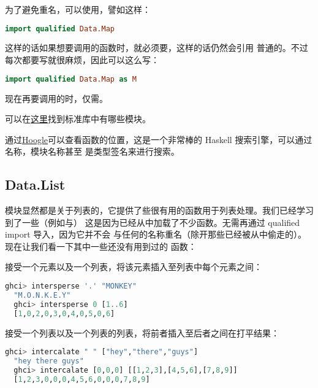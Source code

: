 \documentclass[./main.tex]{subfiles}
\begin{document}
为了避免重名，可以使用，譬如这样：

\begin{lstlisting}[language=Haskell]
  import qualified Data.Map
\end{lstlisting}

这样的话如果想要调用的函数时，就必须要，这样的话仍然会引用
普通的。不过每次都要写就很麻烦，因此可以这么写：

\begin{lstlisting}[language=Haskell]
  import qualified Data.Map as M
\end{lstlisting}

现在再要调用的时，仅需。

可以在\href{https://downloads.haskell.org/ghc/latest/docs/libraries/}{这里}找到标准库中有哪些模块。

通过\href{https://hoogle.haskell.org/}{Hoogle}可以查看函数的位置，这是一个非常棒的 Haskell 搜索引擎，可以通过名称，模块名称甚至
是类型签名来进行搜索。

\subsection*{Data.List}

模块显然都是关于列表的，它提供了些很有用的函数用于列表处理。我们已经学习到了一些（例如与）
这是因为已经从中加载了不少函数。无需再通过 qualified import 导入，因为它并不会
与任何的名称重名（除开那些已经被从中偷走的）。现在让我们看一下其中一些还没有用到过的
函数：

接受一个元素以及一个列表，将该元素插入至列表中每个元素之间：

\begin{lstlisting}[language=Haskell]
  ghci> intersperse '.' "MONKEY"
  "M.O.N.K.E.Y"
  ghci> intersperse 0 [1..6]
  [1,0,2,0,3,0,4,0,5,0,6]
\end{lstlisting}

接受一个列表以及一个列表的列表，将前者插入至后者之间在打平结果：

\begin{lstlisting}[language=Haskell]
  ghci> intercalate " " ["hey","there","guys"]
  "hey there guys"
  ghci> intercalate [0,0,0] [[1,2,3],[4,5,6],[7,8,9]]
  [1,2,3,0,0,0,4,5,6,0,0,0,7,8,9]
\end{lstlisting}
\end{document}
